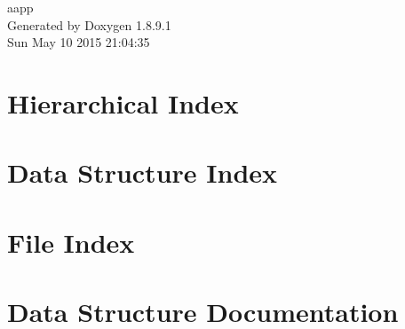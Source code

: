 \documentclass[twoside]{book}
\newcommand{\+}{\discretionary{\mbox{\scriptsize$\hookleftarrow$}}{}{}}
\newcommand{\clearemptydoublepage}{%
  \newpage{\pagestyle{empty}\cleardoublepage}%
}
\begin{document}
\hypersetup{pageanchor=false,
             bookmarks=true,
             bookmarksnumbered=true,
             pdfencoding=unicode
            }
\begin{titlepage}
\vspace*{7cm}
\begin{center}%
{\Large aapp }\\
\vspace*{1cm}
{\large Generated by Doxygen 1.8.9.1}\\
\vspace*{0.5cm}
{\small Sun May 10 2015 21:04:35}\\
\end{center}
\end{titlepage}
\clearemptydoublepage
\tableofcontents
\clearemptydoublepage
{}
\hypersetup{pageanchor=true}

\chapter{Hierarchical Index}

\chapter{Data Structure Index}

\chapter{File Index}

\chapter{Data Structure Documentation}































\end{document}
